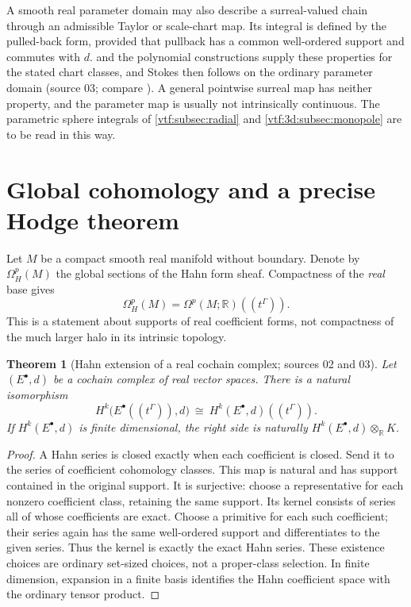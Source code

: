 \documentclass[11pt,letterpaper]{article}
\newtheorem{theorem}{Theorem}[section]
\theoremstyle{definition}
\theoremstyle{remark}
\newcommand{\R}{\mathbb R}\newcommand{\C}{\mathbb C}
\begin{document}
A smooth real parameter domain may also describe a surreal-valued chain through
an admissible Taylor or scale-chart map. Its integral is defined by the
pulled-back form, provided that pullback has a common well-ordered support and
commutes with $d$.  and the polynomial constructions
supply these properties for the stated chart classes, and Stokes then follows on
the ordinary parameter domain (source 03; compare
). A general pointwise surreal map has
neither property, and the parameter map is usually not intrinsically
continuous. The parametric sphere integrals of \cref{vtf:subsec:radial} and
\cref{vtf:3d:subsec:monopole} are to be read in this way.

\section{Global cohomology and a precise Hodge theorem}\label{vtf:sec:cohomology}

Let $M$ be a compact smooth real manifold without boundary. Denote by
$\Omega_H^p(M)$ the global sections of the Hahn form sheaf. Compactness of
the \emph{real} base gives
\[
 \Omega_H^p(M)=\Omega^p(M;\R)((t^\Gamma)).
\]
This is a statement about supports of real coefficient forms, not compactness
of the much larger halo in its intrinsic topology.

\begin{theorem}[Hahn extension of a real cochain complex; sources 02 and 03]\label{vtf:3d:thm:cohomology}
Let $(E^\bullet,d)$ be a cochain complex of real vector spaces. There is a
natural isomorphism
\[
 H^k\bigl(E^\bullet((t^\Gamma)),d\bigr)\ \cong\ H^k(E^\bullet,d)((t^\Gamma)).
\]
If $H^k(E^\bullet,d)$ is finite dimensional, the right side is naturally
$H^k(E^\bullet,d)\otimes_\R K$.
\end{theorem}

\begin{proof}
A Hahn series is closed exactly when each coefficient is closed. Send it to the series of coefficient cohomology classes. This map is natural and has support contained in the original support. It is surjective: choose a representative for each nonzero coefficient class, retaining the same support. Its kernel consists of series all of whose coefficients are exact. Choose a primitive for each such coefficient; their series again has the same well-ordered support and differentiates to the given series. Thus the kernel is exactly the exact Hahn series. These existence choices are ordinary set-sized choices, not a proper-class selection. In finite dimension, expansion in a finite basis identifies the Hahn coefficient space with the ordinary tensor product.
\end{proof}
\end{document}
